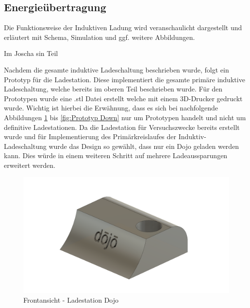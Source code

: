 \subsection{Energieübertragung}\label{sec:energieuebertragung}

Die Funktionsweise der Induktiven Ladung wird veranschaulicht dargestellt und erläutert mit Schema, Simulation und ggf. weitere Abbildungen.


Im Joscha sin Teil
\newline
\newline
\newline
\newline
\newline







Nachdem die gesamte induktive Ladeschaltung beschrieben wurde, folgt ein Prototyp für die Ladestation. Diese implementiert die gesamte primäre induktive Ladeschaltung, welche bereits im oberen Teil beschrieben wurde. Für den Prototypen wurde eine .stl Datei erstellt welche mit einem 3D-Drucker gedruckt wurde. Wichtig ist hierbei die Erwähnung, dass es sich bei nachfolgende Abbildungen \ref{fig:Prototyp Front} bis \ref{fig:Prototyp Down} nur um Prototypen handelt und nicht um definitive Ladestationen. Da die Ladestation für Versuchszwecke bereits erstellt wurde und für Implementierung des Primärkreislaufes der Induktiv-Ladeschaltung wurde das Design so gewählt, dass nur ein Dojo geladen werden kann. Dies würde in einem weiteren Schritt auf mehrere Ladeaussparungen erweitert werden. 

\begin{figure}[H]
	\begin{center}
		\includegraphics[width=120mm]{data/DojoLadestation01.png}
		\caption[Prototyp Ladestation Frontansicht]{Frontansicht - Ladestation Dojo} %
		\label{fig:Prototyp Front}
	\end{center}
\end{figure}


